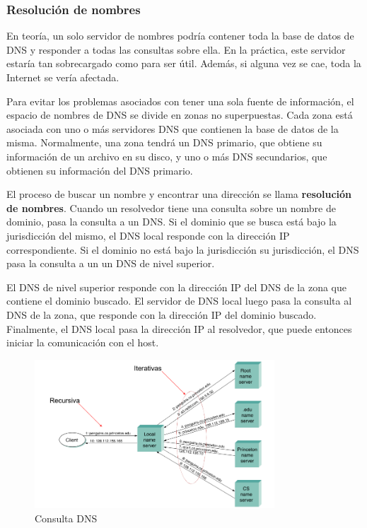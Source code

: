 \subsubsection{Resolución de nombres}
En teoría, un solo servidor de nombres podría contener toda la base de datos de DNS y responder a todas las consultas sobre ella. En la práctica, este servidor estaría tan sobrecargado como para ser útil. Además, si alguna vez se cae, toda la Internet se vería afectada.

Para evitar los problemas asociados con tener una sola fuente de información, el espacio de nombres de DNS se divide en zonas no superpuestas. Cada zona está asociada con uno o más servidores DNS que contienen la base de datos de la misma. Normalmente, una zona tendrá un DNS primario, que obtiene su información de un archivo en su disco, y uno o más DNS secundarios, que obtienen su información del DNS primario. 

El proceso de buscar un nombre y encontrar una dirección se llama \textbf{resolución de nombres}. Cuando un resolvedor tiene una consulta sobre un nombre de dominio, pasa la consulta a un DNS. Si el dominio que se busca está bajo la jurisdicción del mismo, el DNS local responde con la dirección IP correspondiente. Si el dominio no está bajo la jurisdicción su jurisdicción, el DNS pasa la consulta a un un DNS de nivel superior.

El DNS de nivel superior responde con la dirección IP del DNS de la zona que contiene el dominio buscado. El servidor de DNS local luego pasa la consulta al DNS de la zona, que responde con la dirección IP del dominio buscado. Finalmente, el DNS local pasa la dirección IP al resolvedor, que puede entonces iniciar la comunicación con el host.

\begin{figure}[H]
	\centering
	\includegraphics[width=0.8\textwidth
]{images/dns-queries.png}
	\caption[Consulta DNS]{Consulta DNS}
	\label{fig:dns-queries}
\end{figure}

